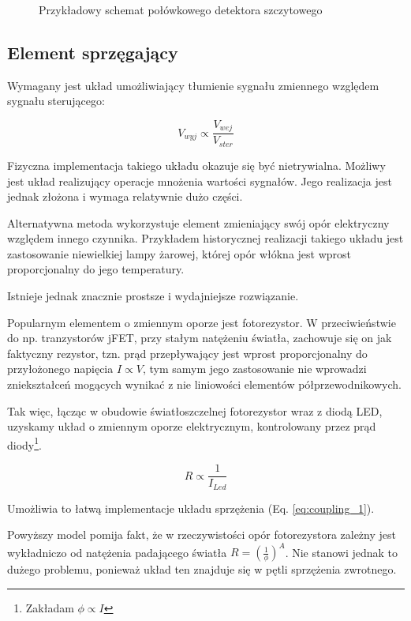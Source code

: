 \documentclass[12pt, a4paper]{article}
\begin{document}
\begin{figure}[h]
	\centering
	
	\caption{Przykładowy schemat połówkowego detektora szczytowego}
	\label{fig:peak-detector-schematic}
\end{figure}

\subsection{Element sprzęgający}
Wymagany jest układ umożliwiający tłumienie sygnału zmiennego względem sygnału sterującego:

\begin{equation}
	V_{wyj} \propto \frac{V_{wej}}{V_{ster}}
	\label{eq:coupling_1}
\end{equation}

Fizyczna implementacja takiego układu okazuje się być nietrywialna.
Możliwy jest układ realizujący operacje mnożenia wartości sygnałów. 
Jego realizacja jest jednak złożona i wymaga relatywnie dużo części.

Alternatywna metoda wykorzystuje element zmieniający swój opór elektryczny względem innego czynnika.
Przykładem historycznej realizacji takiego układu jest zastosowanie niewielkiej lampy żarowej,
której opór włókna jest wprost proporcjonalny do jego temperatury.

Istnieje jednak znacznie prostsze i wydajniejsze rozwiązanie.

Popularnym elementem o zmiennym oporze jest fotorezystor. W przeciwieństwie do 
np. tranzystorów jFET, przy stałym natężeniu światła, zachowuje się on jak faktyczny rezystor,
tzn. prąd przepływający jest wprost proporcjonalny do przyłożonego napięcia
$I \propto V$, tym samym jego zastosowanie nie wprowadzi zniekształceń mogących wynikać
z nie liniowości elementów półprzewodnikowych.

Tak więc, łącząc w obudowie światłoszczelnej fotorezystor wraz z diodą LED,
uzyskamy układ o zmiennym oporze elektrycznym, kontrolowany przez prąd diody\footnote{Zakładam $\phi \propto I$}.

\begin{equation}
	R \propto \frac{1}{I_{Led}}
\end{equation}

Umożliwia to łatwą implementacje układu sprzężenia (Eq. \ref{eq:coupling_1}). 

Powyższy model pomija fakt, że w rzeczywistości opór fotorezystora zależny jest wykładniczo od natężenia padającego światła
$R = \left(\frac{1}{\phi}\right)^A$. Nie stanowi jednak to dużego problemu, ponieważ układ ten znajduje się w 
pętli sprzężenia zwrotnego.
\end{document}
